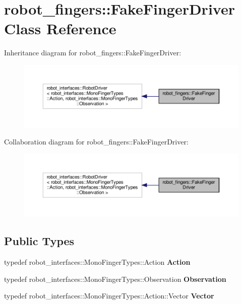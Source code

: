\hypertarget{classrobot__fingers_1_1FakeFingerDriver}{}\section{robot\+\_\+fingers\+:\+:Fake\+Finger\+Driver Class Reference}
\label{classrobot__fingers_1_1FakeFingerDriver}


Inheritance diagram for robot\+\_\+fingers\+:\+:Fake\+Finger\+Driver\+:
\nopagebreak
\begin{figure}[H]
\begin{center}
\leavevmode
\includegraphics[width=350pt]{classrobot__fingers_1_1FakeFingerDriver__inherit__graph}
\end{center}
\end{figure}


Collaboration diagram for robot\+\_\+fingers\+:\+:Fake\+Finger\+Driver\+:
\nopagebreak
\begin{figure}[H]
\begin{center}
\leavevmode
\includegraphics[width=350pt]{classrobot__fingers_1_1FakeFingerDriver__coll__graph}
\end{center}
\end{figure}
\subsection*{Public Types}
\begin{DoxyCompactItemize}
\item 
\mbox{\label{classrobot__fingers_1_1FakeFingerDriver_a6b4051a41538c4802aa409ae09979c73}} 
typedef robot\+\_\+interfaces\+::\+Mono\+Finger\+Types\+::\+Action {\bfseries Action}
\item 
\mbox{\label{classrobot__fingers_1_1FakeFingerDriver_a0d3cb596eea824a0f45179d486839a81}} 
typedef robot\+\_\+interfaces\+::\+Mono\+Finger\+Types\+::\+Observation {\bfseries Observation}
\item 
\mbox{\label{classrobot__fingers_1_1FakeFingerDriver_adaad0a14dc1c21aed76746376983f0c7}} 
typedef robot\+\_\+interfaces\+::\+Mono\+Finger\+Types\+::\+Action\+::\+Vector {\bfseries Vector}
\end{DoxyCompactItemize}
